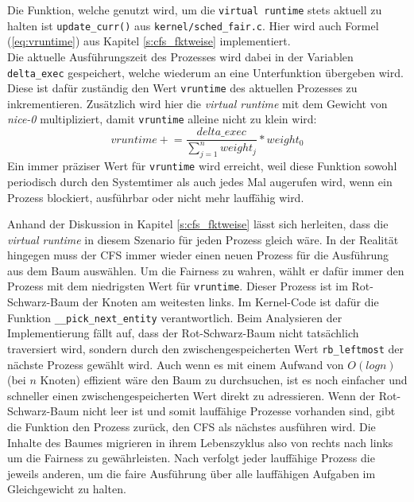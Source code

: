 Die Funktion, welche genutzt wird, um die  \texttt{virtual \- runtime} stets aktuell zu halten ist \texttt{update\_curr()} aus \texttt{kernel/sched\_fair.c}. Hier wird auch Formel (\ref{eq:vruntime}) aus Kapitel \ref{s:cfs_fktweise} implementiert.\\
 Die aktuelle Aus\-füh\-rungs\-zeit des Prozesses wird dabei in der Variablen \texttt{delta\_exec} gespeichert, welche wiederum an eine Unterfunktion über\-geben wird. Diese ist dafür zuständig den Wert \texttt{vruntime} des aktuellen Prozesses zu inkrementieren. Zusätzlich wird hier die \textit{virtual runtime} mit dem Gewicht von \textit{nice-0} multipliziert, damit \texttt{vruntime} alleine nicht zu klein wird:
\begin{equation}
vruntime \mathrel{+}= \frac{delta\_exec}{\sum_{j=1}^{n} weight_j} * weight_{0} 
\label{eq:vrt_inc}
\end{equation}
Ein immer präziser Wert für \texttt{vruntime} wird erreicht, weil diese Funktion sowohl periodisch durch den Systemtimer als auch jedes Mal augerufen wird, wenn ein Prozess blockiert, aus\-führbar oder nicht mehr lauffähig wird.

Anhand der Diskussion in Kapitel \ref{s:cfs_fktweise} lässt sich herleiten, dass die \textit{virtual runtime} in diesem Szenario für jeden Prozess gleich wäre. In der Realität hingegen muss der CFS immer wieder einen neuen Prozess für die Ausführung aus dem Baum auswählen. Um die Fairness zu wahren, wählt er dafür immer den Prozess mit dem niedrigsten Wert für \texttt{vruntime}. Dieser Prozess ist im Rot-Schwarz-Baum der Knoten am weitesten links. Im Kernel-Code ist dafür die Funktion \texttt{\_\_pick\_next\_entity} verantwortlich. Beim \- Analysieren der Implementierung fällt auf, dass der Rot-Schwarz-Baum nicht tatsächlich traversiert wird, sondern durch den zwischengespeicherten Wert \texttt{rb\_leftmost} der nächste Prozess gewählt wird. Auch wenn es mit einem Aufwand von $O(log n)$ (bei $n$ Knoten) effizient wäre den Baum zu durchsuchen, ist es noch einfacher und schneller einen zwischengespeicherten Wert direkt zu adressieren. Wenn der Rot-Schwarz-Baum nicht leer ist und somit lauffähige Prozesse vorhanden sind, gibt die Funktion den Prozess zurück, den CFS als nächstes ausführen wird. Die Inhalte des Baumes migrieren in ihrem Lebenszyklus also von rechts nach links um die Fairness zu gewährleisten. Nach \cite{mjones} verfolgt jeder lauffähige Prozess die jeweils anderen, um die faire Ausführung über alle lauffähigen Aufgaben im Gleichgewicht zu halten.

